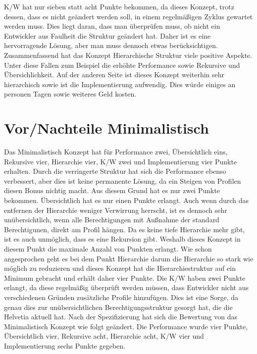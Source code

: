 \ac{K/W} hat nur sieben statt acht Punkte bekommen, da dieses Konzept, trotz dessen, dass es nicht geändert werden soll, in einem regelmäßigen Zyklus gewartet werden muss.
Dies liegt daran, dass man überprüfen muss, ob nicht ein Entwickler aus Faulheit die Struktur geändert hat.
Daher ist es eine hervorragende Lösung, aber man muss dennoch etwas berücksichtigen.
\newline
\newline
Zusammenfassend hat das Konzept Hierarchische Struktur viele positive Aspekte.
Unter diese Fallen zum Beispiel die erhöhte Performance sowie Rekursive und Übersichlichkeit.
Auf der anderen Seite ist dieses Konzept weiterhin sehr hierarchisch sowie ist die Implementierung aufwendig.
Dies würde einiges an personen Tagen sowie weiteres Geld kosten.

\section{Vor/Nachteile Minimalistisch}
\label{sec:chapter05:Minimalistisch}
Das Minimalistisch Konzept hat für Performance zwei, Übersichtlich eins, Rekursive vier, Hierarchie vier, \ac{K/W} zwei und Implementierung vier Punkte erhalten.
Durch die verringerte Struktur hat sich die Performance ebenso verbessert, aber dies ist keine permanente Lösung, da ein Steigen von Profilen diesen Bonus nichtig macht.
Aus diesem Grund hat es nur zwei Punkte bekommen.
Übersichtlich hat es nur einen Punkte erlangt.
Auch wenn durch das entfernen der Hierarchie weniger Verwirrung herrscht, ist es dennoch sehr unübersichtlich, wenn alle Berechtigungen mit Außnahme der standard Berechtigunen, direkt am Profil hängen.
Da es keine tiefe Hierarchie mehr gibt, ist es auch unmöglich, dass es eine Rekursion gibt.
Weshalb dieses Konzept in diesem Punkt die maximale Anzahl von Punkten erlangt.
Wie schon angesprochen geht es bei dem Punkt Hierarchie darum die Hierarchie so stark wie möglich zu reduzieren und dieses Konzept hat die Hierarchiestruktur auf ein Minimum gebracht und erhält daher vier Punkte.
Die \ac{K/W} haben zwei Punkte erlangt, da diese regelmäßig überprüft werden müssen, dass Entwickler nicht aus verschiedenen Gründen zusätzliche Profile hinzufügen.
Dies ist eine Sorge, da genau dies zur unübersichtlichen Berechtigungsstruktur gesorgt hat, die die Helvetia aktuell hat.
\newline
\newline
Nach der Spezifizierung hat sich die Bewertung von das Minimalistisch Konzept wie folgt geändert.
Die Performance wurde vier Punkte, Übersichtlich vier, Rekursive acht, Hierarchie acht, \ac{K/W} vier und Implementierung sechs Punkte gegeben.
